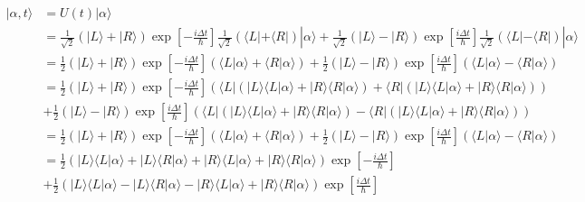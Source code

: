\documentclass[a4paper]{article}
\begin{document}
\begin{answer}
    \begin{align*}
        |\alpha,t\rangle &= U(t)|\alpha\rangle \\
        &= \frac{1}{\sqrt{2}}(|L \rangle + |R\rangle) \exp{\left[-\frac{i\Delta t}{\hbar}\right]} \frac{1}{\sqrt{2}}(\langle L| + \langle R|)|\alpha\rangle + \frac{1}{\sqrt{2}}(|L \rangle - |R\rangle) \exp{\left[\frac{i\Delta t}{\hbar}\right]} \frac{1}{\sqrt{2}}(\langle L| - \langle R|)|\alpha\rangle\\
        &= \frac{1}{2}(|L \rangle + |R\rangle) \exp{\left[-\frac{i\Delta t}{\hbar}\right]} (\langle L|\alpha\rangle + \langle R|\alpha\rangle) + \frac{1}{2}(|L \rangle - |R\rangle) \exp{\left[\frac{i\Delta t}{\hbar}\right]} (\langle L|\alpha\rangle - \langle R|\alpha\rangle)\\
        &= \frac{1}{2}(|L \rangle + |R\rangle) \exp{\left[-\frac{i\Delta t}{\hbar}\right]} (\langle L|(|L\rangle \langle L|\alpha\rangle + |R\rangle \langle R|\alpha\rangle) + \langle R|(|L\rangle \langle L|\alpha\rangle + |R\rangle \langle R|\alpha\rangle)) \\
        &+ \frac{1}{2}(|L \rangle - |R\rangle) \exp{\left[\frac{i\Delta t}{\hbar}\right]} (\langle L|(|L\rangle \langle L|\alpha\rangle + |R\rangle \langle R|\alpha\rangle) - \langle R|(|L\rangle \langle L|\alpha\rangle + |R\rangle \langle R|\alpha\rangle))\\
        &= \frac{1}{2}(|L \rangle + |R\rangle) \exp{\left[-\frac{i\Delta t}{\hbar}\right]} (\langle L|\alpha\rangle + \langle R|\alpha\rangle) + \frac{1}{2}(|L \rangle - |R\rangle) \exp{\left[\frac{i\Delta t}{\hbar}\right]} (\langle L|\alpha\rangle - \langle R|\alpha\rangle)\\
        &= \frac{1}{2}(|L \rangle \langle L | \alpha \rangle + |L \rangle \langle R | \alpha \rangle + |R \rangle \langle L | \alpha \rangle + |R \rangle \langle R | \alpha \rangle) \exp{\left[-\frac{i\Delta t}{\hbar}\right]} \\
        &+ \frac{1}{2}(|L \rangle \langle L | \alpha \rangle - |L \rangle \langle R | \alpha \rangle - |R \rangle \langle L | \alpha \rangle + |R \rangle \langle R | \alpha \rangle) \exp{\left[\frac{i\Delta t}{\hbar}\right]} \\
    \end{align*}
    \end{answer}
\end{document}
